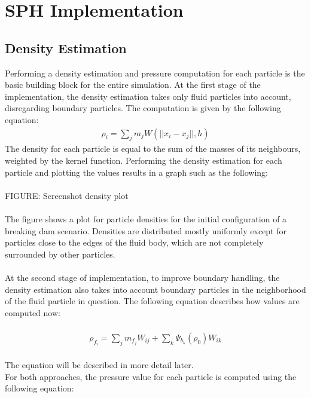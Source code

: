 \documentclass{ACGSeminar}
\begin{document}
\section{SPH Implementation}
\subsection{Density Estimation}
Performing a density estimation and pressure computation for each particle is the basic building block for the entire simulation.
At the first stage of the implementation, the density estimation takes only fluid particles into account, disregarding boundary particles. The computation is given by the following equation:\\
\begin{equation} 
\begin{aligned}
\rho_i = \sum_j m_j W(||x_i - x_j||,h) 
\end{aligned}
\end{equation}
The density for each particle is equal to the sum of the masses of its neighbours, weighted by the kernel function. Performing the density estimation for each particle and plotting the values results in a graph such as the following:\\
\\
FIGURE: Screenshot density plot\\
\\
The figure shows a plot for particle densities for the initial configuration of a breaking dam scenario.
Densities are distributed mostly uniformly except for particles close to the edges of the fluid body, which are not completely surrounded by other particles.\\
\\
At the second stage of implementation, to improve boundary handling, the density estimation also takes into account boundary particles in the neighborhood of the fluid particle in question. The following equation describes how values are computed now:\\
\\
\begin{equation} 
\begin{aligned}
\rho_{f_{i}} = \sum_{j}m_{f_{j}}W_{ij} + \sum_{k}\Psi_{b_{k}}(\rho_{0})W_{ik}
\end{aligned}
\end{equation}
\\
The equation will be described in more detail later.\\
For both approaches, the pressure value for each particle is computed using the following equation:\\
\end{document}
